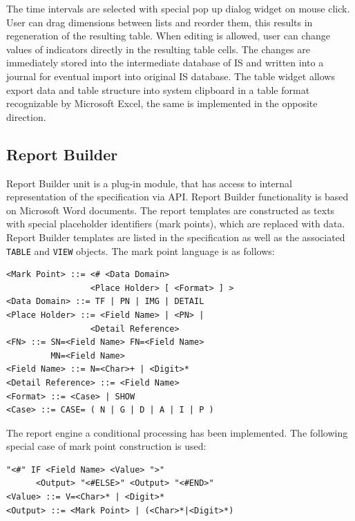 \documentclass[conference]{IEEEtran}
\begin{document}
The time intervals are selected with special pop up dialog widget on mouse click.  User can drag dimensions between lists and reorder them, this results in regeneration of the resulting table.  When editing is allowed, user can change values of indicators directly in the resulting table cells.  The changes are immediately stored into the intermediate database of IS and written into a journal for eventual import into original IS database.  The table widget allows export data and table structure into system clipboard in a table format recognizable by Microsoft Excel, the same is implemented in the opposite direction.

\subsection{Report Builder}
\label{sec:report-builder}

Report Builder unit is a plug-in module, that has access to internal representation of the specification via API.  Report Builder functionality is based on Microsoft Word documents.  The report templates are constructed as texts with special placeholder identifiers (mark points), which are replaced with data.  Report Builder templates are listed in the specification as well as the associated \texttt{TABLE} and \texttt{VIEW} objects.  The mark point language is as follows:

\begin{lstlisting}
<Mark Point> ::= <# <Data Domain>
                 <Place Holder> [ <Format> ] >
<Data Domain> ::= TF | PN | IMG | DETAIL
<Place Holder> ::= <Field Name> | <PN> |
                 <Detail Reference>
<FN> ::= SN=<Field Name> FN=<Field Name>
         MN=<Field Name>
<Field Name> ::= N=<Char>+ | <Digit>*
<Detail Reference> ::= <Field Name>
<Format> ::= <Case> | SHOW
<Case> ::= CASE= ( N | G | D | A | I | P )
\end{lstlisting}

The report engine a conditional processing has been implemented.  The following special case of mark point construction is used:
\begin{lstlisting}
"<#" IF <Field Name> <Value> ">"
      <Output> "<#ELSE>" <Output> "<#END>"
<Value> ::= V=<Char>* | <Digit>*
<Output> ::= <Mark Point> | (<Char>*|<Digit>*)
\end{lstlisting}
\end{document}
